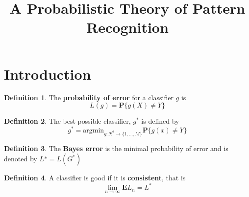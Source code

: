\documentclass{article}
\theoremstyle{definition}
\newtheorem{definition}{Definition}
\begin{document}
\title{A Probabilistic Theory of Pattern Recognition}
\maketitle
\tableofcontents

\section{Introduction}
\begin{definition}
	The \textbf{probability of error} for a classifier $g$ is
	\begin{equation}
	L(g)=\mathbf{P}\{g(X)\ne Y\}
	\end{equation}
\end{definition}
\begin{definition}
	The best possible classifier, $g^*$ is defined by
	\begin{equation}
	g^*=\text{argmin}_{g:\mathcal{R}^d\rightarrow\{1,\ldots,M\}}{\mathbf{P}\{g(x)\ne Y\}}
	\end{equation}
\end{definition}
\begin{definition}
	The \textbf{Bayes error} is the minimal probability of error and is denoted by $L* = L(G^*)$
\end{definition}
\begin{definition}
	A classifier is good if it is \textbf{consistent}, that is
	\begin{equation}
		\lim_{n\rightarrow \infty}{\mathbf{E}L_n=L^*}
	\end{equation}
\end{definition}
\end{document}
